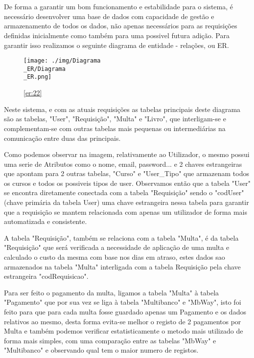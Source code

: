 \section{}

De forma a garantir um bom funcionamento e estabilidade para o sistema, é necessário desenvolver uma base de dados com capacidade de gestão e armazenamento de todos os dados, não apenas necessários para as requisições definidas inicialmente como também para uma possivel futura adição.
Para garantir isso realizamos o seguinte diagrama de entidade - relações, ou ER.

\begin{figure}[H]
	\centering
	\texttt{[image: ./img/Diagrama\\\_ER/Diagrama\\\_ER.png]}  %
	\caption{\ref{er:22}}
	\label{fig:chap220}
\end{figure}

Neste sistema, e com as atuais requisições as tabelas principais deste diagrama são as tabelas, "User", "Requisição", "Multa" e "Livro", que interligam-se e complementam-se com outras tabelas mais pequenas ou intermediárias na comunicação entre duas das principais.

\par Como podemos observar na imagem, relativamente ao Utilizador, o mesmo possui uma serie de Atributos como o nome, email, password... e 2 chaves estrangeiras que apontam para 2 outras tabelas, "Curso" e "User\_Tipo" que armazenam todos os cursos e todos os possiveis tipos de user.
Observamos então que a tabela "User" se encontra diretamente conectada com a tabela "Requisição" sendo o "codUser" (chave primária da tabela User) uma chave estrangeira nessa tabela para garantir que a requisição se mantem relacionada com apenas um utilizador de forma mais automatizada e consistente.

\par A tabela "Requisição", também se relaciona com a tabela "Multa", é da tabela "Requisição" que será verificada a necessidade de aplicação de uma multa e calculado o custo da mesma com base nos dias em atraso, estes dados sao armazenados na tabela "Multa" interligada com  a tabela Requisição pela chave estrangeira "codRequisicao".

\par Para ser feito o pagamento da multa, ligamos a tabela "Multa" à tabela "Pagamento" que por sua vez se liga à tabela "Multibanco" e "MbWay", isto foi feito para que para cada multa fosse guardado apenas um Pagamento e os dados relativos ao mesmo, desta forma evita-se melhor o registo de 2 pagamentos por Multa e também podemos verificar estatisticamente o metodo mais utilizado de forma mais simples, com uma comparação entre as tabelas "MbWay" e "Multibanco" e observando qual tem o maior numero de registos.

